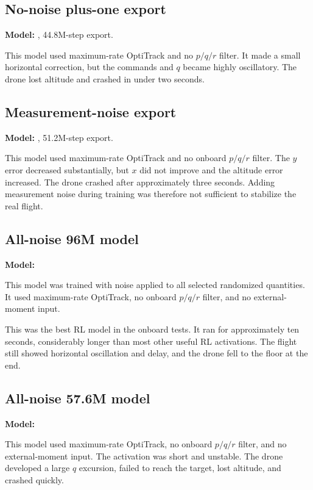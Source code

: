 \documentclass[11pt,a4paper]{article}
\begin{document}
\subsection{No-noise plus-one export}

\textbf{Model:} , 44.8M-step export.

This model used maximum-rate OptiTrack and no $p/q/r$ filter. It made a small horizontal correction, but the commands and $q$ became highly oscillatory. The drone lost altitude and crashed in under two seconds.

\subsection{Measurement-noise export}

\textbf{Model:} , 51.2M-step export.

This model used maximum-rate OptiTrack and no onboard $p/q/r$ filter. The $y$ error decreased substantially, but $x$ did not improve and the altitude error increased. The drone crashed after approximately three seconds. Adding measurement noise during training was therefore not sufficient to stabilize the real flight.

\subsection{All-noise 96M model}

\textbf{Model:} 

This model was trained with noise applied to all selected randomized quantities. It used maximum-rate OptiTrack, no onboard $p/q/r$ filter, and no external-moment input.

This was the best RL model in the onboard tests. It ran for approximately ten seconds, considerably longer than most other useful RL activations. The flight still showed horizontal oscillation and delay, and the drone fell to the floor at the end.

\subsection{All-noise 57.6M model}

\textbf{Model:} 

This model used maximum-rate OptiTrack, no onboard $p/q/r$ filter, and no external-moment input. The activation was short and unstable. The drone developed a large $q$ excursion, failed to reach the target, lost altitude, and crashed quickly.
\end{document}
